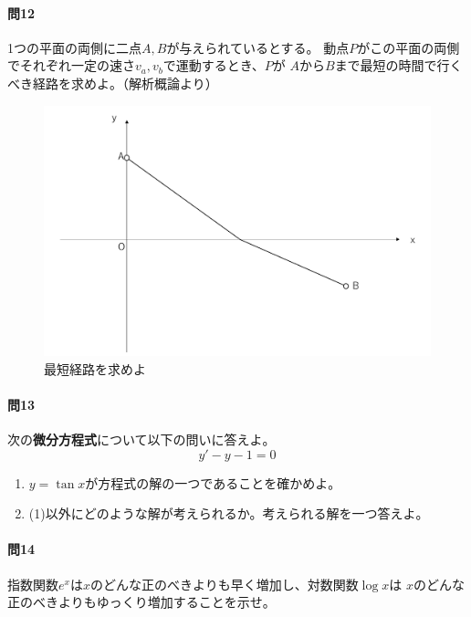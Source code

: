 \documentclass[a4j,dvipdfmx]{jsarticle}
\begin{document}
            \paragraph{問12}1つの平面の両側に二点$A,B$が与えられているとする。
            動点$P$がこの平面の両側でそれぞれ一定の速さ$v_a,v_b$で運動するとき、$P$が
            $A$から$B$まで最短の時間で行くべき経路を求めよ。（解析概論より）
            \begin{figure}[h]
                \centering
                \includegraphics[scale=0.3]{img/QuuNote/snellQuestion.png}
                \caption{最短経路を求めよ}
            \end{figure}

            \paragraph{問13}次の\textbf{微分方程式}について以下の問いに答えよ。
                \begin{equation*}
                    y'-y-1=0
                \end{equation*}
                \begin{enumerate}\renewcommand{\labelenumi}{(\arabic{enumi})}
                    \item $y=\tan x$が方程式の解の一つであることを確かめよ。
                    \item (1)以外にどのような解が考えられるか。考えられる解を一つ答えよ。
                \end{enumerate}
            
            \paragraph{問14}指数関数$e^x$は$x$のどんな正のべきよりも早く増加し、対数関数$\log x$は
            $x$のどんな正のべきよりもゆっくり増加することを示せ。   
            
\end{document}
